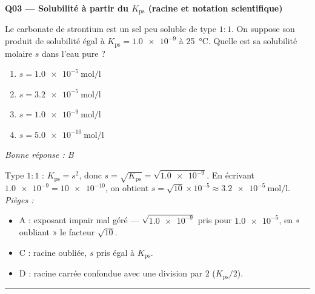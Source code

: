 \documentclass[11pt,a4paper]{article}
\begin{document}
\noindent\textbf{Q03 --- Solubilité à partir du $K_{\mathrm{ps}}$ (racine et notation scientifique)}\par
Le carbonate de strontium  est un sel peu soluble de type $1{:}1$. On suppose son produit de
solubilité égal à $K_{\mathrm{ps}} = \num{1.0e-9}$ à \qty{25}{\degreeCelsius}. Quelle est sa solubilité
molaire $s$ dans l'eau pure ?
\begin{enumerate}[label=\Alph*)]
\item $s = \qty{1.0e-5}{\mole\per\litre}$
\item $s = \qty{3.2e-5}{\mole\per\litre}$
\item $s = \qty{1.0e-9}{\mole\per\litre}$
\item $s = \qty{5.0e-10}{\mole\per\litre}$
\end{enumerate}
\textit{Bonne réponse : B}\par
Type $1{:}1$ : $K_{\mathrm{ps}} = s^{2}$, donc $s = \sqrt{K_{\mathrm{ps}}} = \sqrt{\num{1.0e-9}}$. En
écrivant $\num{1.0e-9} = \num{10e-10}$, on obtient $s = \sqrt{10}\times 10^{-5} \approx \qty{3.2e-5}{\mole\per\litre}$.
\textit{Pièges :}
\begin{itemize}
\item A : exposant impair mal géré — $\sqrt{\num{1.0e-9}}$ pris pour $\num{1.0e-5}$, en « oubliant » le facteur $\sqrt{10}$.
\item C : racine oubliée, $s$ pris égal à $K_{\mathrm{ps}}$.
\item D : racine carrée confondue avec une division par $2$ ($K_{\mathrm{ps}}/2$).
\end{itemize}
\vspace{6pt}\hrule\vspace{8pt}
\end{document}
